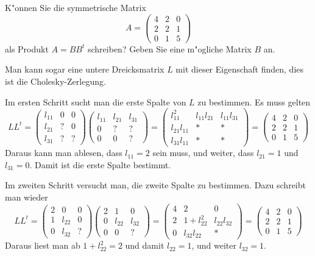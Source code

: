 K"onnen Sie die symmetrische Matrix
\[
A
=
\begin{pmatrix}
4&2&0\\
2&2&1\\
0&1&5
\end{pmatrix}
\]
als Produkt $A=BB^t$ schreiben? Geben Sie eine m"ogliche
Matrix $B$ an.

\begin{loesung}
Man kann sogar eine untere Dreicksmatrix $L$ mit dieser Eigenschaft
finden, dies ist die Cholesky-Zerlegung.

Im ersten Schritt sucht man die erste Spalte von $L$ zu bestimmen.
Es muss gelten
\[
LL^t=
\begin{pmatrix}
l_{11}&  0&  0\\
l_{21}&  ?&  0\\
l_{31}&  ?&  ?
\end{pmatrix}
\begin{pmatrix}
l_{11}&l_{21}&l_{31}\\
     0&     ?&     ?\\
     0&     0&     ?
\end{pmatrix}
=
\begin{pmatrix}
    l_{11}^2&l_{11}l_{21}&l_{11}l_{31}\\
l_{21}l_{11}&           *&           *\\
l_{31}l_{11}&           *&           *
\end{pmatrix}
=
\begin{pmatrix}
4&2&0\\
2&2&1\\
0&1&5
\end{pmatrix}
\]
Daraus kann man ablesen, dass $l_{11}=2$ sein muss, und weiter,
dass
$l_{21}=1$ und $l_{31}=0$. Damit ist die erste Spalte bestimmt.

Im zweiten Schritt versucht man, die zweite Spalte zu bestimmen.
Dazu schreibt man wieder
\[
LL^t
=
\begin{pmatrix}
2&     0&0\\
1&l_{22}&0\\
0&l_{32}&?
\end{pmatrix}
\begin{pmatrix}
2&     1&     0\\
0&l_{22}&l_{32}\\
0&     0&?
\end{pmatrix}
=
\begin{pmatrix}
4&2           &           0\\
2&1+l_{22}^2  &l_{22}l_{32}\\
0&l_{32}l_{22}&         *
\end{pmatrix}
=
\begin{pmatrix}
4&2&0\\
2&2&1\\
0&1&5
\end{pmatrix}
\]
Daraus liest man ab $1+l_{22}^2=2$ und damit $l_{22}=1$, und weiter
$l_{32}=1$.


\end{loesung}
